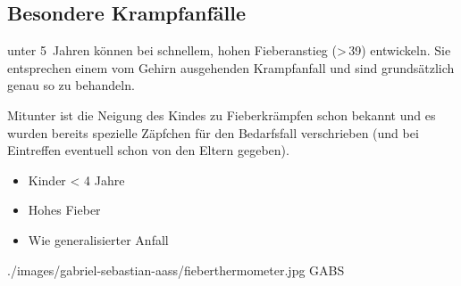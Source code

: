 % 
% 


\subsection{Besondere Krampfanfälle}

{%
\label{topic:fieberkrampf}%
%
%
%
 unter 5~Jahren können bei schnellem, hohen
Fieberanstieg ({\textgreater}\,39{\DegC}) 
 entwickeln. Sie entsprechen einem vom
Gehirn ausgehenden Krampfanfall und sind grundsätzlich genau
so zu behandeln.

Mitunter ist die Neigung des Kindes zu Fieberkrämpfen schon
bekannt und es wurden bereits spezielle Zäpfchen für den
Bedarfsfall verschrieben (und bei Eintreffen eventuell schon
von den Eltern gegeben).
}{
\begin{itemize}
  \item Kinder {\textless} 4 Jahre
  \item Hohes Fieber
  \item Wie generalisierter Anfall
\end{itemize}
}
{./images/gabriel-sebastian-aass/fieberthermometer.jpg}
{}
{GABS}



